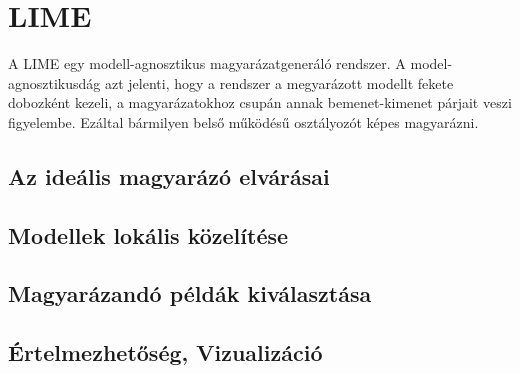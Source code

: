 \chapter{LIME}\label{ch:lime}

A LIME egy modell-agnosztikus magyarázatgeneráló rendszer. A model-agnosztikusdág azt jelenti, hogy a rendszer a megyarázott modellt fekete dobozként kezeli, a magyarázatokhoz csupán annak bemenet-kimenet párjait veszi figyelembe. Ezáltal bármilyen belső működésű osztályozót képes magyarázni.

\section{Az ideális magyarázó elvárásai}





\section{Modellek lokális közelítése}
\section{Magyarázandó példák kiválasztása}
\section{Értelmezhetőség, Vizualizáció}